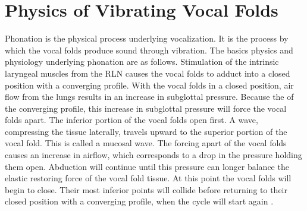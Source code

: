 \documentclass[12pt, letter]{report}
\begin{document}
\section{Physics of Vibrating Vocal Folds}
Phonation is the physical process underlying vocalization. It is the process by which the vocal folds produce sound through vibration. The basics physics and physiology underlying phonation are as follows. Stimulation of the intrinsic laryngeal muscles from the RLN causes the vocal folds to adduct into a closed position with a converging profile. With the vocal folds in a closed position, air flow from the lungs results in an increase in subglottal pressure. Because the of the converging profile, this increase in subglottal pressure will force the vocal folds apart. The inferior portion of the vocal folds open first. A wave, compressing the tissue laterally, travels upward to the superior portion of the vocal fold. This is called a mucosal wave. The forcing apart of the vocal folds causes an increase in airflow, which corresponds to a drop in the pressure holding them open. Abduction will continue until this pressure can longer balance the elastic restoring force of the vocal fold tissue. At this point the vocal folds will begin to close. Their most inferior points will collide before returning to their closed position with a converging profile, when the cycle will start again \cite{Titze2000, Berke2010}.
\end{document}
